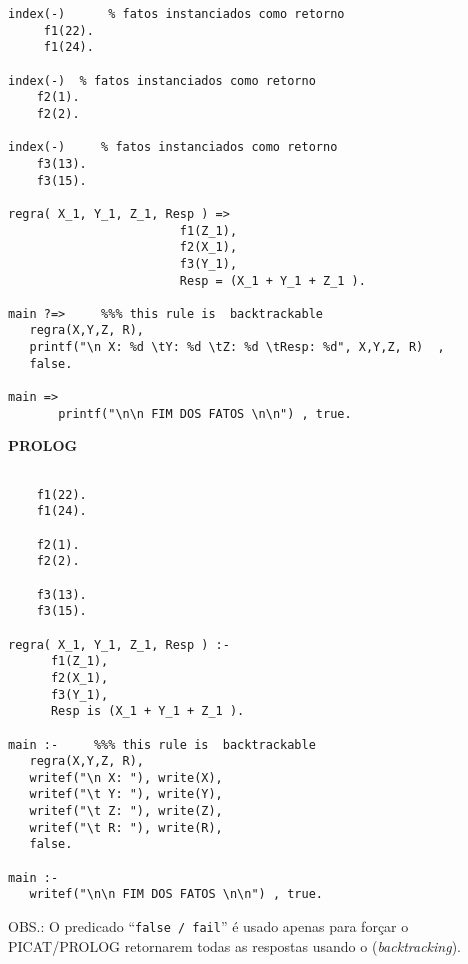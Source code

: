 \documentclass[a4paper,11pt]{article}
\begin{document}
\begin{enumerate}
\begin{minipage}{0.45\textwidth}
\begin{tiny}
\begin{verbatim}
index(-)      % fatos instanciados como retorno
     f1(22).
     f1(24).
	
index(-)  % fatos instanciados como retorno
    f2(1).
    f2(2).
	
index(-)     % fatos instanciados como retorno
    f3(13).
    f3(15).
    
regra( X_1, Y_1, Z_1, Resp ) =>     
                      	f1(Z_1),
          	            f2(X_1),
          	            f3(Y_1),
          	            Resp = (X_1 + Y_1 + Z_1 ).

main ?=>     %%% this rule is  backtrackable
   regra(X,Y,Z, R),                            
   printf("\n X: %d \tY: %d \tZ: %d \tResp: %d", X,Y,Z, R)  ,  
   false.

main => 
       printf("\n\n FIM DOS FATOS \n\n") , true.
\end{verbatim}
\end{tiny}
\end{minipage}
\begin{minipage}{0.45\textwidth}
\begin{tiny}
\begin{center}{\bf PROLOG}\end{center}
\begin{verbatim}

    f1(22).
    f1(24).
	
    f2(1).
    f2(2).
	
    f3(13).
    f3(15).
    
regra( X_1, Y_1, Z_1, Resp ) :-     
      f1(Z_1),
      f2(X_1),
      f3(Y_1),
      Resp is (X_1 + Y_1 + Z_1 ).

main :-     %%% this rule is  backtrackable
   regra(X,Y,Z, R),                            
   writef("\n X: "), write(X),
   writef("\t Y: "), write(Y),
   writef("\t Z: "), write(Z), 
   writef("\t R: "), write(R), 
   false.

main :- 
   writef("\n\n FIM DOS FATOS \n\n") , true.
\end{verbatim}
\end{tiny}
\end{minipage}

\vskip 0.3cm

OBS.: O predicado ``\texttt{false / fail}''  é usado  apenas para forçar o PICAT/PROLOG retornarem todas as respostas usando o ({\em backtracking}). 



\end{enumerate}
\end{document}
